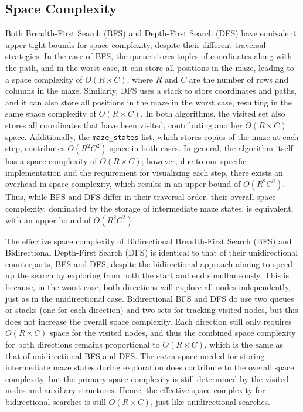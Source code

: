\documentclass[final, journal, 11pt]{report}
\begin{document}
	
	
	
	
	
	
	
	
	
	\subsection*{Space Complexity}
		Both Breadth-First Search (BFS) and Depth-First Search (DFS) have equivalent upper tight bounds for space complexity, despite their different traversal strategies. In the case of BFS, the queue stores tuples of coordinates along with the path, and in the worst case, it can store all positions in the maze, leading to a space complexity of \( O(R \times C) \), where \( R \) and \( C \) are the number of rows and columns in the maze. Similarly, DFS uses a stack to store coordinates and paths, and it can also store all positions in the maze in the worst case, resulting in the same space complexity of \( O(R \times C) \). In both algorithms, the visited set also stores all coordinates that have been visited, contributing another \( O(R \times C) \) space. Additionally, the \texttt{maze\_states} list, which stores copies of the maze at each step, contributes \( O(R^2 C^2) \) space in both cases. In general, the algorithm itself has a space complexity of \( O(R \times C) \); however, due to our specific implementation and the requirement for visualizing each step, there exists an overhead in space complexity, which results in an upper bound of \( O(R^2 C^2) \). Thus, while BFS and DFS differ in their traversal order, their overall space complexity, dominated by the storage of intermediate maze states, is equivalent, with an upper bound of \( O(R^2 C^2) \).
		
		The effective space complexity of Bidirectional Breadth-First Search (BFS) and Bidirectional Depth-First Search (DFS) is identical to that of their unidirectional counterparts, BFS and DFS, despite the bidirectional approach aiming to speed up the search by exploring from both the start and end simultaneously. This is because, in the worst case, both directions will explore all nodes independently, just as in the unidirectional case. Bidirectional BFS and DFS do use two queues or stacks (one for each direction) and two sets for tracking visited nodes, but this does not increase the overall space complexity. Each direction still only requires \(O(R \times C)\) space for the visited nodes, and thus the combined space complexity for both directions remains proportional to \(O(R \times C)\), which is the same as that of unidirectional BFS and DFS. The extra space needed for storing intermediate maze states during exploration does contribute to the overall space complexity, but the primary space complexity is still determined by the visited nodes and auxiliary structures. Hence, the effective space complexity for bidirectional searches is still \(O(R \times C)\), just like unidirectional searches.
		
\end{document}
